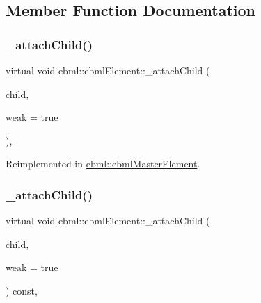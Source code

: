 \subsection{Member Function Documentation}
\mbox{\label{classebml_1_1ebmlElement_aadc63457f069b5bcdbd81ee8a9801979}} 
\subsubsection{\texorpdfstring{\+\_\+attach\+Child()}{\_attachChild()}\hspace{0.1cm}{\footnotesize\ttfamily [1/2]}}
{\footnotesize\ttfamily virtual void ebml\+::ebml\+Element\+::\+\_\+attach\+Child (\begin{DoxyParamCaption}\item[{const \mbox{\hyperlink{namespaceebml_adad533b7705a16bb360fe56380c5e7be}{ebml\+Element\+\_\+sp}} \&}]{child,  }\item[{bool}]{weak = {\ttfamily true} }\end{DoxyParamCaption})\hspace{0.3cm}{\ttfamily [protected]}, {\ttfamily [virtual]}}



Reimplemented in \mbox{\hyperlink{classebml_1_1ebmlMasterElement_a16b141ac7d241a9b95c029761fdfc02f}{ebml\+::ebml\+Master\+Element}}.

\mbox{\label{classebml_1_1ebmlElement_a588c003e8cfba8455fd6da9f879330d7}} 
\subsubsection{\texorpdfstring{\+\_\+attach\+Child()}{\_attachChild()}\hspace{0.1cm}{\footnotesize\ttfamily [2/2]}}
{\footnotesize\ttfamily virtual void ebml\+::ebml\+Element\+::\+\_\+attach\+Child (\begin{DoxyParamCaption}\item[{const \mbox{\hyperlink{namespaceebml_adad533b7705a16bb360fe56380c5e7be}{ebml\+Element\+\_\+sp}} \&}]{child,  }\item[{bool}]{weak = {\ttfamily true} }\end{DoxyParamCaption}) const\hspace{0.3cm}{\ttfamily [protected]}, {\ttfamily [virtual]}}

